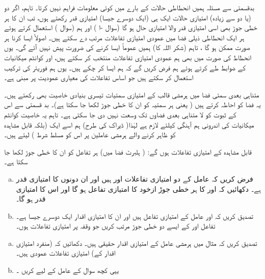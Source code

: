  بدقسمتی سے مسئلہ  ہمیں انحطاطی حالات  کے بارے میں کوئی معلومات فراہم نہیں کرتا۔ تاہم، اگر دو (یا دو سے زیادہ) امتیازی حالات ایک ہی (ایک دوسرے جیسا) امتیازی قدر رکھتے ہوں، تب ان کا ہر خطی جوڑ بھی اسی امتیازی قدر والا امتیازی حال ہو گا (سوال -ا ) اور ہم  (سوال ) استعمال کرتے ہوئے ہر ایک انحطاطی ذیلی فضا میں عمودی امتیازی تفاعلات   مرتب  دے سکتے ہیں۔ اصولاً  ایسا کرنا ہر صورت ممکن ہو گا ، تاہم (شکر اللہ کا) ہمیں عموماً ایسا کرنے کی ضرورت پیش نہیں آئے گی۔ یوں انحطاط کی صورت میں بھی ہم عمودی امتیازی تفاعلات منتخب کر سکتے ہیں، اور کوانٹم میکانیات کے ضوابط طے کرتے ہوئے ہم فرض کریں گے کہ ہم ایسا کر چکے ہیں۔ یوں ہم فوریئر کی ترکیب استعمال کر سکتے ہیں جو اساس تفاعلات کی معیاری عمودیت پر مبنی ہے۔
 
 متناہی بعدی سمتی فضا میں ہرمشی قالب کے امتیازی سمتیات تیسری بنیادی خاصیت بھی رکھتے ہیں۔ یہ فضا کو احاطہ کرتے ہیں ( یعنی ہر سمتیہ کو ان کا خطی جوڑ لکھا جا سکتا ہے)۔ بد قسمتی سے اس کے ثبوت کو لا متناہی بعدی فضاوں تک وسعت نہیں دی جا سکتی ہے۔ تاہم یہ خاصیت کوانٹم میکانیات کی اندرونی ہم آہنگی کیلئے لازم ہے لہٰذا( ڈیراک کی طرح) ہم اسے ایک  (بلکہ قابل مشاہدہ کو ظاہر کرنے والے ہرمشی عاملین پر اس کو مسلط شرط ) لیتے ہیں۔
 
 قابل مشاہدہ کے امتیازی تفاعلات  ہوں گے: ( ہلبرٹ فضا میں) ہر تفاعل کو ان کا خطی جوڑ لکھا جا سکتا ہے۔ 

\begin{enumerate}[a.]
\item
 فرض کریں کہ عامل  کے دو امتیازی تفاعلات  اور  ہیں اور ان دونوں کا امتیازی قدر  ہے۔ دکھائیں کہ  اور  کا ہر خطی جوڑ ازخود  کا امتیازی تفاعل ہو گا اور اس کا امتیازی قدر  ہو گا۔
\item
 تصدیق کریں کہ  اور  عامل  کے امتیازی تفاعل ہیں اور ان کا امتیازی اقدار ایک دوسرے جیسا ہے۔تفاعل  اور  کے ایسے دو خطی جوڑ مرتب کریں  جو وقفہ  پر  امتیازی تفاعلات ہوں۔
\end{enumerate}
\begin{enumerate}[a.]
\item
 تصدیق کریں کہ مثال  میں ہرمشی عامل کے امتیازی اقدار حقیقی ہیں۔ دکھائیں کہ (منفرد امتیازی اقدار کے) امتیازی تفاعلات عمودی ہیں۔ 
\item
 یہی کچھ سوال  کے عامل کے لیے کریں ۔
\end{enumerate}


